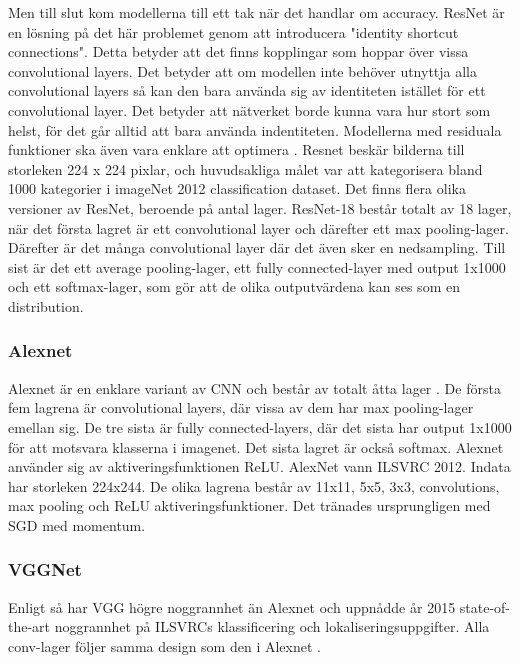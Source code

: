 \documentclass[]{kththesis}
\begin{document}
Men till slut kom modellerna till ett tak när det handlar om accuracy. ResNet är en lösning på det här problemet genom att introducera "identity shortcut connections". Detta betyder att det finns kopplingar som hoppar över vissa convolutional layers. Det betyder att om modellen inte behöver utnyttja alla convolutional layers så kan den bara använda sig av identiteten istället för ett convolutional layer. Det betyder att nätverket borde kunna vara hur stort som helst, för det går alltid att bara använda indentiteten. Modellerna med residuala funktioner ska även vara enklare att optimera \parencite{he2016deep}. Resnet beskär bilderna till storleken 224 x 224 pixlar, och huvudsakliga målet var att kategorisera bland 1000 kategorier i imageNet 2012 classification dataset. Det finns flera olika versioner av ResNet, beroende på antal lager. ResNet-18 består totalt av 18 lager, när det första lagret är ett convolutional layer och därefter ett max pooling-lager. Därefter är det många convolutional layer där det även sker en nedsampling. Till sist är det ett average pooling-lager, ett fully connected-layer med output 1x1000 och ett softmax-lager, som gör att de olika outputvärdena kan ses som en distribution. 

\subsubsection{Alexnet}
Alexnet är en enklare variant av CNN och består av totalt åtta lager \parencite{krizhevsky2012imagenet}. De första fem lagrena är convolutional layers, där vissa av dem har max pooling-lager emellan sig. De tre sista är fully connected-layers, där det sista har output 1x1000 för att motsvara klasserna i imagenet. Det sista lagret är också softmax. Alexnet använder sig av aktiveringsfunktionen ReLU. AlexNet vann ILSVRC 2012. Indata har storleken 224x244. De olika lagrena består av 11x11, 5x5, 3x3, convolutions, max pooling och ReLU aktiveringsfunktioner. Det tränades ursprungligen med SGD med momentum.

\subsubsection{VGGNet}
Enligt \cite{simonyan2014very} så har VGG högre noggrannhet än Alexnet och uppnådde år 2015 state-of-the-art noggrannhet på ILSVRCs klassificering och lokaliseringsuppgifter. Alla conv-lager följer samma design som den i Alexnet \parencite{simonyan2014very}. 
\end{document}
